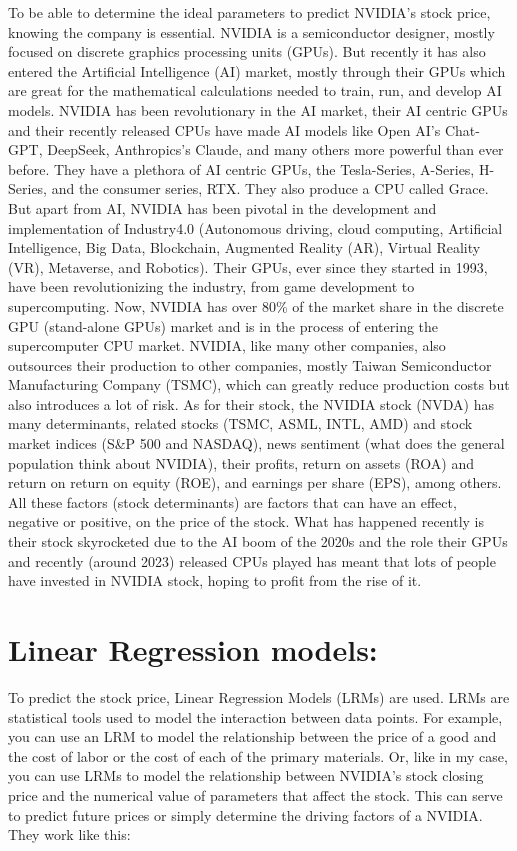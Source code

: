 \documentclass[12pt]{article}
\begin{document}
To be able to determine the ideal parameters to predict NVIDIA’s stock price, knowing the company is essential. NVIDIA is a semiconductor designer, mostly focused on discrete graphics processing units (GPUs). But recently it has also entered the Artificial Intelligence (AI) market, mostly through their GPUs which are great for the mathematical calculations needed to train, run, and develop AI models. NVIDIA has been revolutionary in the AI market, their AI centric GPUs and their recently released CPUs have made AI models like Open AI’s Chat-GPT, DeepSeek, Anthropics’s Claude, and many others more powerful than ever before. They have a plethora of AI centric GPUs, the Tesla-Series, A-Series, H-Series, and the consumer series, RTX. They also produce a CPU called Grace. But apart from AI, NVIDIA has been pivotal in the development and implementation of Industry4.0 (Autonomous driving, cloud computing, Artificial Intelligence, Big Data, Blockchain, Augmented Reality (AR), Virtual Reality (VR), Metaverse, and Robotics). Their GPUs, ever since they started in 1993, have been revolutionizing the industry, from game development to supercomputing. Now, NVIDIA has over 80\% of the market share in the discrete GPU (stand-alone GPUs) market and is in the process of entering the supercomputer CPU market. NVIDIA, like many other companies, also outsources their production to other companies, mostly Taiwan Semiconductor Manufacturing Company (TSMC), which can greatly reduce production costs but also introduces a lot of risk. As for their stock, the NVIDIA stock (NVDA) has many determinants, related stocks (TSMC, ASML, INTL, AMD) and stock market indices (S\&P 500 and NASDAQ), news sentiment (what does the general population think about NVIDIA), their profits, return on assets (ROA) and return on return on equity (ROE), and earnings per share (EPS), among others. All these factors (stock determinants) are factors that can have an effect, negative or positive, on the price of the stock. What has happened recently is their stock skyrocketed due to the AI boom of the 2020s and the role their GPUs and recently (around 2023) released CPUs played has meant that lots of people have invested in NVIDIA stock, hoping to profit from the rise of it.

\section{Linear Regression models:}

To predict the stock price, Linear Regression Models (LRMs) are used. LRMs are statistical tools used to model the interaction between data points. For example, you can use an LRM to model the relationship between the price of a good and the cost of labor or the cost of each of the primary materials. Or, like in my case, you can use LRMs to model the relationship between NVIDIA’s stock closing price and the numerical value of parameters that affect the stock. This can serve to predict future prices or simply determine the driving factors of a NVIDIA. They work like this:
\end{document}
